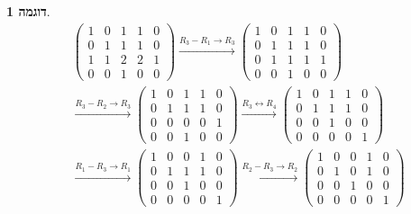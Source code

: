 \documentclass[12pt]{report}
\theoremstyle{plain}
\theoremstyle{definition}
\newtheorem{example}{דוגמה}[chapter]
\newcommand{\0}{\mathbf{0}}
\begin{document}
\begin{example}
$$
\begin{aligned}
&\left(
\begin{array}{ccc|c|c}
1 & 0 & 1 & 1 & 0\\
0 & 1 & 1 & 1 & 0\\
1 & 1 & 2 & 2 & 1\\
0 & 0 & 1 & 0 & 0
\end{array}
\right)
\xrightarrow{R_3 - R_1\to R_3}
\left(
\begin{array}{ccc|c|c}
1 & 0 & 1 & 1 & 0\\
0 & 1 & 1 & 1 & 0\\
0 & 1 & 1 & 1 & 1\\
0 & 0 & 1 & 0 & 0
\end{array}
\right)
\\[8pt]
&\xrightarrow{R_3 - R_2\to R_3}
\left(
\begin{array}{ccc|c|c}
1 & 0 & 1 & 1 & 0\\
0 & 1 & 1 & 1 & 0\\
0 & 0 & 0 & 0 & 1\\
0 & 0 & 1 & 0 & 0
\end{array}
\right)
\xrightarrow{R_3 \leftrightarrow R_4}
\left(
\begin{array}{ccc|c|c}
1 & 0 & 1 & 1 & 0\\
0 & 1 & 1 & 1 & 0\\
0 & 0 & 1 & 0 & 0\\
0 & 0 & 0 & 0 & 1
\end{array}
\right)
\\[8pt]
&\xrightarrow{R_1 - R_3\to R_1}
\left(
\begin{array}{ccc|c|c}
1 & 0 & 0 & 1 & 0\\
0 & 1 & 1 & 1 & 0\\
0 & 0 & 1 & 0 & 0\\
0 & 0 & 0 & 0 & 1
\end{array}
\right)
\xrightarrow{R_2 - R_3\to R_2}
\left(
\begin{array}{ccc|c|c}
1 & 0 & 0 & 1 & 0\\
0 & 1 & 0 & 1 & 0\\
0 & 0 & 1 & 0 & 0\\
0 & 0 & 0 & 0 & 1
\end{array}
\right)
\end{aligned}
$$


\end{example}
\end{document}
